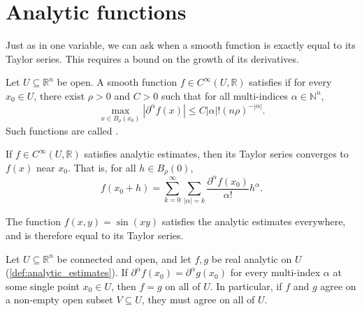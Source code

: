 \section{Analytic functions}
\label{sec:analytic_functions}

Just as in one variable, we can ask when a smooth function is exactly equal to its Taylor series. This requires a bound on the growth of its derivatives.

\begin{definition}
\label{def:analytic_estimates}
Let $U \subseteq \mathbb{R}^n$ be open. A smooth function $f \in C^\infty(U, \mathbb{R})$ satisfies  if for every $x_0 \in U$, there exist $\rho > 0$ and $C > 0$ such that for all multi-indices $\alpha \in \mathbb{N}^n$,
\[ \max_{x \in B_\rho(x_0)} |\partial^\alpha f(x)| \leq C |\alpha|! \left(n\rho\right)^{-|\alpha|}. \]
Such functions are called .
\end{definition}

\begin{theorem}
\label{thm:convergence_taylor_series}
If $f \in C^\infty(U, \mathbb{R})$ satisfies analytic estimates, then its Taylor series converges to $f(x)$ near $x_0$. That is, for all $h \in B_\rho(0)$,
\[ f(x_0+h) = \sum_{k=0}^\infty \sum_{|\alpha|=k} \frac{\partial^\alpha f(x_0)}{\alpha!} h^\alpha. \]
\end{theorem}

\begin{example}
\label{ex:analytic_function_sin_xy}
The function $f(x,y) = \sin(xy)$ satisfies the analytic estimates everywhere, and is therefore equal to its Taylor series.
\end{example}

\begin{corollary}
\label{cor:unique_continuation}
Let $U \subseteq \mathbb{R}^n$ be connected and open, and let $f,g$ be real analytic on $U$
(\cref{def:analytic_estimates}). If $\partial^\alpha f(x_0) = \partial^\alpha g(x_0)$ for every
multi-index $\alpha$ at some single point $x_0 \in U$, then $f = g$ on all of $U$. In
particular, if $f$ and $g$ agree on a non-empty open subset $V \subseteq U$, they must agree on
all of $U$.
\end{corollary}

